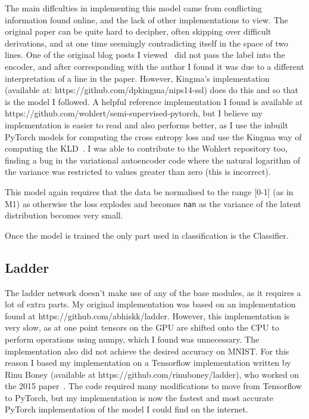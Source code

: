 The main diffculties in implementing this model came from conflicting information found online, and the lack of other implementations to view. 
The original paper can be quite hard to decipher, often skipping over difficult derivations, and at one time seemingly contradicting 
itself in the space of two lines. One of the original blog posts I viewed~\cite{Semisupe95:online} did not pass the label into the 
encoder, and after corresponding with the author I found it was due to a different interpretation of a line in the paper. However,
Kingma's implementation (available at: https://github.com/dpkingma/nips14-ssl) does do this and so that is the model I followed. A 
helpful reference implementation I found is available at https://github.com/wohlert/semi-supervised-pytorch, but I believe my implementation is 
easier to read and also performs better, as I use the inbuilt PyTorch models for computing the cross entropy loss and use the Kingma way 
of computing the KLD~\cite{DBLP:journals/corr/KingmaW13}. I was able to contribute to the Wohlert repository too, finding a bug in the 
variational autoencoder code where the natural logarithm of the variance was restricted to values greater than zero (this is incorrect).

This model again requires that the data be normalised to the range [0-1] (as in M1) as otherwise the loss explodes and becomes 
\texttt{nan} as the variance of the latent distribution becomes very small.

Once the model is trained the only part used in classification is the Classifier.

\subsection{Ladder}

The ladder network doesn't make use of any of the base modules, as it requires a lot of extra parts. My original implementation 
was based on an implementation found at https://github.com/abhiskk/ladder. However, this implementation is very slow, as at one point 
tensors on the GPU are shifted onto the CPU to perform operations using numpy, which I found was unnecessary. The implementation also did 
not achieve the desired accuracy on MNIST. For this reason I based my implementation on a Tensorflow implementation written by Rinu Boney
(available at https://github.com/rinuboney/ladder), who worked on 
the 2015 paper~\cite{DBLP:journals/corr/RasmusVHBR15}. The code required many modifications to move from Tensorflow to PyTorch,
but my implementation is now the fastest and most accurate PyTorch implementation of the model I could find on the internet.

